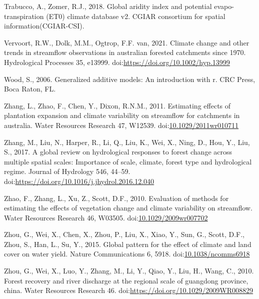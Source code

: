 \documentclass[]{elsarticle} %
\newlength{\cslhangindent}
\newlength{\cslentryspacingunit} %
\newenvironment{CSLReferences}[2] %
 {%
  \setlength{\parindent}{0pt}
  \ifodd #1
  \let\oldpar\par
  \def\par{\hangindent=\cslhangindent\oldpar}
  \fi
  \setlength{\parskip}{#2\cslentryspacingunit}
 }%
 {}
\begin{document}
\begin{CSLReferences}{1}{0}
\leavevmode{}%
Trabucco, A., Zomer, R.J., 2018. Global aridity index and potential evapo-transpiration (ET0) climate database v2. CGIAR consortium for spatial information(CGIAR-CSI).

\leavevmode{}%
Vervoort, R.W., Dolk, M.M., Ogtrop, F.F. van, 2021. Climate change and other trends in streamflow observations in australian forested catchments since 1970. Hydrological Processes 35, e13999. doi:\url{https://doi.org/10.1002/hyp.13999}

\leavevmode{}%
Wood, S., 2006. Generalized additive models: An introduction with r. CRC Press, Boca Raton, FL.

\leavevmode{}%
Zhang, L., Zhao, F., Chen, Y., Dixon, R.N.M., 2011. Estimating effects of plantation expansion and climate variability on streamflow for catchments in australia. Water Resources Research 47, W12539. doi:\href{https://doi.org/10.1029/2011wr010711}{10.1029/2011wr010711}

\leavevmode{}%
Zhang, M., Liu, N., Harper, R., Li, Q., Liu, K., Wei, X., Ning, D., Hou, Y., Liu, S., 2017. A global review on hydrological responses to forest change across multiple spatial scales: Importance of scale, climate, forest type and hydrological regime. Journal of Hydrology 546, 44--59. doi:\url{https://doi.org/10.1016/j.jhydrol.2016.12.040}

\leavevmode{}%
Zhao, F., Zhang, L., Xu, Z., Scott, D.F., 2010. Evaluation of methods for estimating the effects of vegetation change and climate variability on streamflow. Water Resources Research 46, W03505. doi:\href{https://doi.org/10.1029/2009wr007702}{10.1029/2009wr007702}

\leavevmode{}%
Zhou, G., Wei, X., Chen, X., Zhou, P., Liu, X., Xiao, Y., Sun, G., Scott, D.F., Zhou, S., Han, L., Su, Y., 2015. Global pattern for the effect of climate and land cover on water yield. Nature Communications 6, 5918. doi:\href{https://doi.org/10.1038/ncomms6918}{10.1038/ncomms6918}

\leavevmode{}%
Zhou, G., Wei, X., Luo, Y., Zhang, M., Li, Y., Qiao, Y., Liu, H., Wang, C., 2010. Forest recovery and river discharge at the regional scale of guangdong province, china. Water Resources Research 46. doi:\url{https://doi.org/10.1029/2009WR008829}

\end{CSLReferences}
\end{document}
